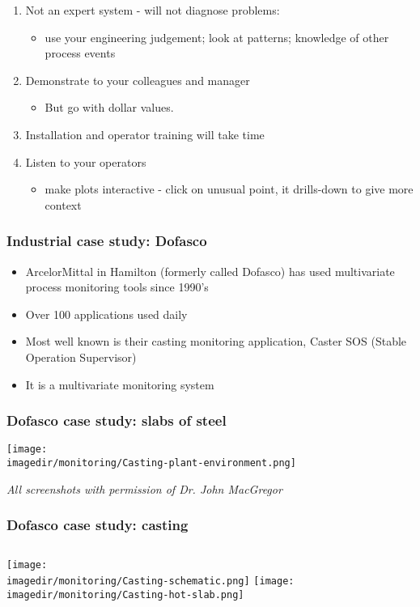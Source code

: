 \begin{frame}[allowframebreaks]
\begin{enumerate}
\begin{itemize}
		\end{itemize}
		\item	Not an expert system - will not diagnose problems: 
		\begin{itemize}
			\item	use your engineering judgement; look at patterns; knowledge of other process events 
		\end{itemize}
		\item	Demonstrate to your colleagues and manager 
		\begin{itemize}
			\item	But go with dollar values. 
		\end{itemize}
		\item	Installation and operator training will take time 
		\item	Listen to your operators 
		\begin{itemize}
			\item	make plots interactive - click on unusual point, it drills-down to give more context 
		\end{itemize}
	\end{enumerate}
\end{frame}

\begin{frame}\frametitle{Industrial case study: Dofasco}
	\begin{itemize}
		\item	ArcelorMittal in Hamilton (formerly called Dofasco) has used multivariate process monitoring tools since 1990's 
		\item	Over 100 applications used daily 
		\item	Most well known is their casting monitoring application, Caster SOS (Stable Operation Supervisor) 
		\item	It is a multivariate monitoring system 
	\end{itemize}
\end{frame}

\begin{frame}\frametitle{Dofasco case study: slabs of steel}
	
	\texttt{[image: \\imagedir/monitoring/Casting-plant-environment.png]}
	
	\emph{All screenshots with permission of Dr. John MacGregor}
\end{frame}

\begin{frame}\frametitle{Dofasco case study: casting}
	\begin{columns}
		\column{5cm} 
		\texttt{[image: \\imagedir/monitoring/Casting-schematic.png]} \column{5cm} 
		\texttt{[image: \\imagedir/monitoring/Casting-hot-slab.png]} 
	\end{columns}
\end{frame}

